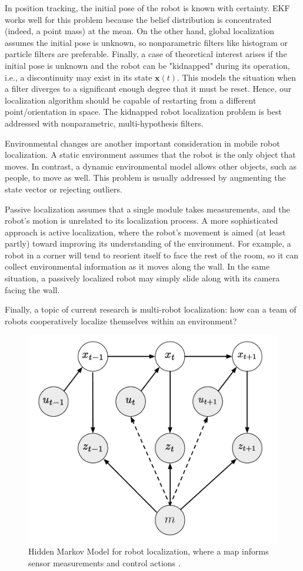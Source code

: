 \documentclass[twoside]{article}
\begin{document}
In position tracking, the initial pose of the robot is known with certainty. EKF works well for this problem because the belief distribution is concentrated (indeed, a point mass) at the mean. On the other hand, global localization assumes the initial pose is unknown, so nonparametric filters like histogram or particle filters are preferable. Finally, a case of theoretical interest arises if the initial pose is unknown and the robot can be "kidnapped" during its operation, i.e., a discontinuity may exist in its state $\mathbf{x}(t)$. This models the situation when a filter diverges to a significant enough degree that it must be reset. Hence, our localization algorithm should be capable of restarting from a different point/orientation in space. The kidnapped robot localization problem is best addressed with nonparametric, multi-hypothesis filters.

Environmental changes are another important consideration in mobile robot localization. A static environment assumes that the robot is the only object that moves. In contrast, a dynamic environmental model allows other objects, such as people, to move as well. This problem is usually addressed by augmenting the state vector or rejecting outliers.

Passive localization assumes that a single module takes measurements, and the robot's motion is unrelated to its localization process. A more sophisticated approach is active localization, where the robot's movement is aimed (at least partly) toward improving its understanding of the environment. For example, a robot in a corner will tend to reorient itself to face the rest of the room, so it can collect environmental information as it moves along the wall. In the same situation, a passively localized robot may simply slide along with its camera facing the wall.

Finally, a topic of current research is multi-robot localization: how can a team of robots cooperatively localize themselves within an environment?

\begin{figure}[H]
\centering
\includegraphics[width=0.45\linewidth]{HMM_w_map.png}
\caption{Hidden Markov Model for robot localization, where a map informs sensor measurements and control actions \cite{Xmisc}.}
\label{fig:HMM_with_map}
\end{figure}

\printbibliography
\end{document}
